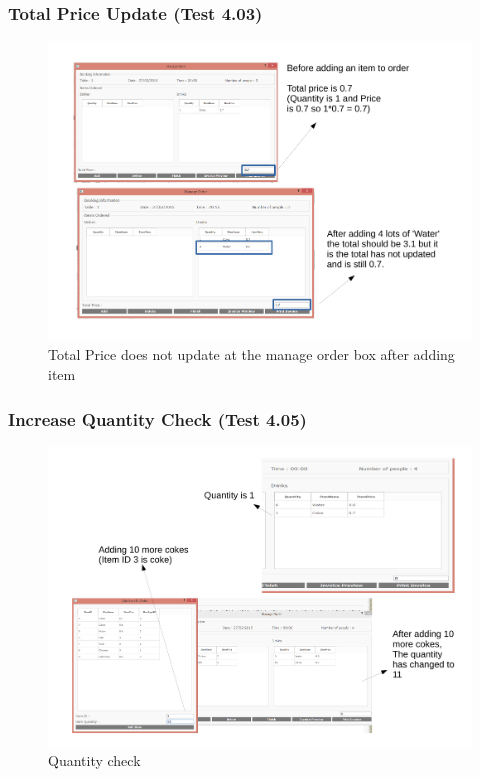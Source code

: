 \begin{landscape}
\subsubsection{Total Price Update (Test 4.03)}

\begin{figure}[H]
    \includegraphics[width = 20cm]{./Testing/images/test10}
    \caption{Total Price does not update at the manage order box after adding item} \label{fig:Test10}
\end{figure}

\subsubsection{Increase Quantity Check (Test 4.05)}

\begin{figure}[H]
    \includegraphics[width = 20cm]{./Testing/images/Test6.pdf}
    \caption{Quantity check} \label{fig:Test6}
\end{figure}


\end{landscape}
